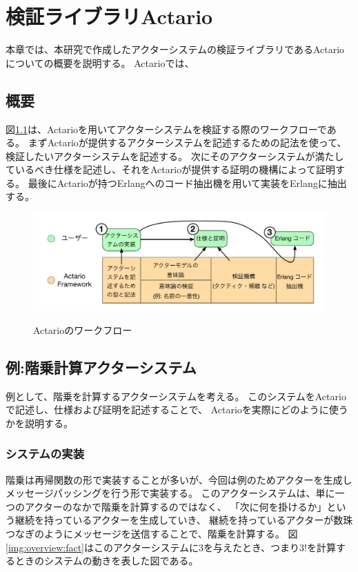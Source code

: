 \chapter{検証ライブラリActario}
\label{chapter:overview}

本章では、本研究で作成したアクターシステムの検証ライブラリであるActarioについての概要を説明する。
Actarioでは、

\section{概要}

図\ref{img:overview:workflow}は、Actarioを用いてアクターシステムを検証する際のワークフローである。
まずActarioが提供するアクターシステムを記述するための記法を使って、検証したいアクターシステムを記述する。
次にそのアクターシステムが満たしているべき仕様を記述し、それをActarioが提供する証明の機構によって証明する。
最後にActarioが持つErlangへのコード抽出機を用いて実装をErlangに抽出する。

\begin{figure}[tp]
  \centering
  \includegraphics[width=15cm]{./img/overview/workflow.pdf}
  \label{img:overview:workflow}
  \caption{Actarioのワークフロー}
\end{figure}

\section{例:階乗計算アクターシステム}

例として、階乗を計算するアクターシステムを考える。
このシステムをActarioで記述し、仕様および証明を記述することで、
Actarioを実際にどのように使うかを説明する。

\subsection{システムの実装}

階乗は再帰関数の形で実装することが多いが、今回は例のためアクターを生成しメッセージパッシングを行う形で実装する。
このアクターシステムは、単に一つのアクターのなかで階乗を計算するのではなく、
「次に何を掛けるか」という継続を持っているアクターを生成していき、
継続を持っているアクターが数珠つなぎのようにメッセージを送信することで、階乗を計算する。
図\ref{img:overview:fact}はこのアクターシステムに$3$を与えたとき、つまり$3!$を計算するときのシステムの動きを表した図である。

